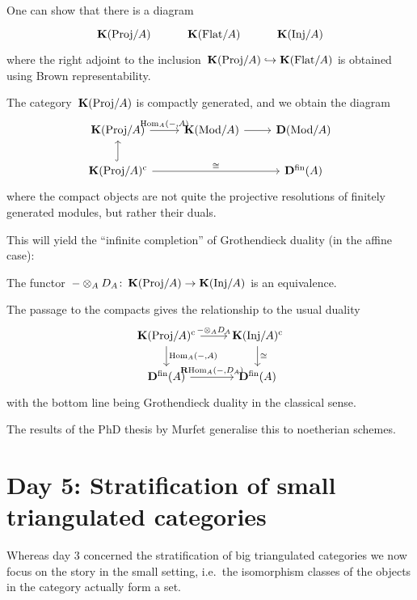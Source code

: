 \documentclass[10pt,a4paper]{article}
\begin{document}
One can show that there is a diagram %
\begin{equation}
  \begin{tikzcd}
    \KKK(\mathrm{Proj}/A) & \KKK(\Flat/A) & \KKK(\Inj/A)
  \end{tikzcd}
\end{equation}
where the right adjoint to the inclusion~$\operatorname{\mathbf{K}}(\mathrm{Proj}/A)\hookrightarrow\operatorname{\mathbf{K}}(\mathrm{Flat}/A)$ is obtained using Brown representability.
\begin{proposition}
  The category~$\operatorname{\mathbf{K}}(\mathrm{Proj}/A)$ is compactly generated, and we obtain the diagram
  \begin{equation}
    \begin{tikzcd}
      \KKK(\mathrm{Proj}/A) \arrow{r}{\Hom_A(-,A)} & \KKK(\Mod/A) \arrow{r} & \derived(\Mod/A) \\
      \KKK(\mathrm{Proj}/A)^\cc \arrow[hook]{u} \arrow{rr}{\cong} & & \derived^\fin(A)
    \end{tikzcd}
  \end{equation}
  where the compact objects are not quite the projective resolutions of finitely generated modules, but rather their duals.
\end{proposition}
This will yield the ``infinite completion'' of Grothendieck duality (in the affine case):
\begin{theorem}
  The functor~$-\otimes_AD_A\colon\operatorname{\mathbf{K}}(\mathrm{Proj}/A)\to\operatorname{\mathbf{K}}(\mathrm{Inj}/A)$ is an equivalence.
\end{theorem}
The passage to the compacts gives the relationship to the usual duality
\begin{equation}
  \begin{tikzcd}
    \KKK(\mathrm{Proj}/A)^\cc \arrow{r}{-\otimes_AD_A} \arrow{d}{\Hom_A(-,A)} & \KKK(\Inj/A)^\cc \arrow{d}{\cong} \\
    \derived^\fin(A) \arrow{r}{\RRRHom_A(-,D_A)} & \derived^\fin(A)
  \end{tikzcd}
\end{equation}
with the bottom line being Grothendieck duality in the classical sense.

\begin{remark}
  The results of the PhD thesis by Murfet generalise this to noetherian schemes.
\end{remark}

\section{Day 5: Stratification of small triangulated categories}
Whereas day 3 concerned the stratification of big triangulated categories we now focus on the story in the small setting, i.e.\ the isomorphism classes of the objects in the category actually form a set.
\end{document}
